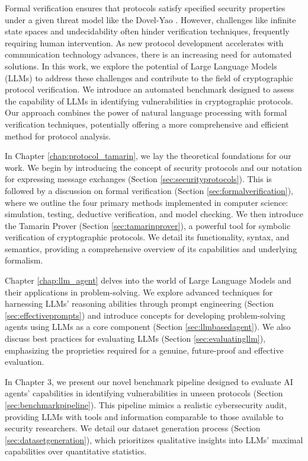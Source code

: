 \documentclass[a4paper,12pt,twoside,openany]{book}
\begin{document}
Formal verification ensures that protocols satisfy specified security properties under a given threat model like the Dovel-Yao \cite{dolevyao}. However, challenges like infinite state spaces and undecidability often hinder verification techniques, frequently requiring human intervention. As new protocol development accelerates with communication technology advances, there is an increasing need for automated solutions. In this work, we explore the potential of Large Language Models (LLMs) to address these challenges and contribute to the field of cryptographic protocol verification. We introduce an automated benchmark designed to assess the capability of LLMs in identifying vulnerabilities in cryptographic protocols. Our approach combines the power of natural language processing with formal verification techniques, potentially offering a more comprehensive and efficient method for protocol analysis.

In Chapter \ref{chap:protocol_tamarin}, we lay the theoretical foundations for our work. We begin by introducing the concept of security protocols and our notation for expressing message exchanges (Section \ref{sec:securityprotocols}). This is followed by a discussion on formal verification (Section \ref{sec:formalverification}), where we outline the four primary methods implemented in computer science: simulation, testing, deductive verification, and model checking. We then introduce the Tamarin Prover (Section \ref{sec:tamarinprover}), a powerful tool for symbolic verification of cryptographic protocols. We detail its functionality, syntax, and semantics, providing a comprehensive overview of its capabilities and underlying formalism.

Chapter \ref{chap:llm_agent} delves into the world of Large Language Models and their applications in problem-solving. We explore advanced techniques for harnessing LLMs' reasoning abilities through prompt engineering (Section \ref{sec:effectiveprompts}) and introduce concepts for developing problem-solving agents using LLMs as a core component (Section \ref{sec:llmbasedagent}). We also discuss best practices for evaluating LLMs (Section \ref{sec:evaluatingllm}), emphasizing the proprieties required for a genuine, future-proof and effective evaluation.

In Chapter 3, we present our novel benchmark pipeline designed to evaluate AI agents' capabilities in identifying vulnerabilities in unseen protocols (Section \ref{sec:benchmarkpipeline}). This pipeline mimics a realistic cybersecurity audit, providing LLMs with tools and information comparable to those available to security researchers. We detail our dataset generation process (Section \ref{sec:datasetgeneration}), which prioritizes qualitative insights into LLMs' maximal capabilities over quantitative statistics.
\end{document}
